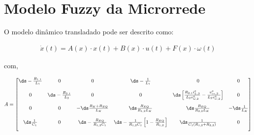 \section*{Modelo Fuzzy da Microrrede}

O modelo dinâmico transladado pode ser descrito como:

\begin{gather*}
  \dot{x}(t) = A(x) \cdot x(t) + B(x) \cdot u(t) + F(x) \cdot \omega(t)
\end{gather*}

com,

\begin{gather}
  A = \begin{bmatrix}
    \ds - \frac{R_{1,1}}{L_1} & 0                                          & 0                                & \ds - \frac{1}{L_1}                                                  & 0                                                                                             & 0                   \\[12pt]
    0                         & \ds - \frac{R_{2,1}}{L_2}                  & 0                                & 0                                                                    & \ds \left[ \frac{R_{2,1} i_{L,2}^o}{L_2 v_{C,2}^o} - \frac{v_{in,2}^o}{L_2 v_{C,2}^o} \right] & 0                   \\[12pt]
    0                         & 0                                          & - \ds \frac{R_K + R_{EQ}}{L_K}   & \ds \frac{R_{EQ}}{R_{1,2} L_K}                                       & \ds \frac{R_{EQ}}{R_{2,2} L_K}                                                                & - \ds \frac{1}{L_K} \\[12pt]
    \ds \frac{1}{C_1}         & 0                                          & \ds - \frac{R_{EQ}}{R_{1,2} C_1} & \ds - \frac{1}{R_{1,2}C_1} \left[ 1 - \frac{R_{EQ}}{R_{1,2}} \right] & \ds \frac{1}{C_1 \left(R_{1,2} + R_{2,2}\right)}                                              & 0                   \\[12pt]

\end{bmatrix}
\end{gather}
